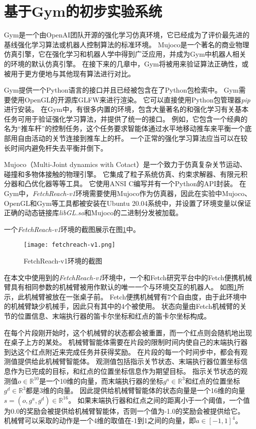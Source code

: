 \section{基于Gym的初步实验系统}\label{gymexp}
Gym\cite{brockman2016openai}是一个由OpenAI团队开源的强化学习仿真环境，它已经成为了评价最先进的基线强化学习算法或机器人控制算法的标准环境。
Mujoco\cite{todorov2012mujoco}是一个著名的商业物理仿真引擎，它在强化学习和机器人学中得到广泛应用，并成为Gym中机器人相关的环境的默认仿真引擎。
在接下来的几章中，Gym将被用来验证算法正确性，或被用于更方便地与其他现有算法进行对比。

Gym提供一个Python语言的接口并且已经被包含在了Python包检索中。
Gym需要使用OpenGL的开源库GLFW来进行渲染。
它可以直接使用Python包管理器\emph{pip}进行安装。
在Gym中，有很多内置的环境，包含大量著名的和强化学习有关基本任务可用于验证强化学习算法，并提供了统一的接口。
例如，它包含一个经典的名为“推车杆”的控制任务，这个任务要求智能体通过水平地移动推车来平衡一个底部用自由活动的关节连接到推车上的杆。
一个正常的强化学习算法应当可以在较长时间内避免杆失去平衡并倒下。

Mujoco（Multi-Joint dynamics with Cotact）是一个致力于仿真复杂关节运动、碰撞和多物体接触的物理引擎。
它集成了粒子系统仿真、约束求解器、有限元积分器和凸优化器等等工具。
它使用ANSI C编写并有一个Python的API封装。
在Gym中，\emph{FetchReach-v1}环境需要使用Mujoco作为仿真器，因此在实验中Mujoco、OpenGL和Gym等工具都被安装在Ubuntu 20.04系统中，并设置了环境变量以保证正确的动态链接库\emph{libGL.so}和Mujoco的二进制分发被加载。

一个\emph{FetchReach-v1}环境的截图展示在图\ref{fetchreach-v1}中。
    \begin{figure}[htpb]
        \centering
        \texttt{[image: fetchreach-v1.png]}
        \caption{FetchReach-v1环境的截图}
        \label{fetchreach-v1}
    \end{figure}
在本文中使用到的\emph{FetchReach-v1}环境中，一个和Fetch研究平台中的Fetch便携机械臂具有相同参数的机械臂被用作默认的唯一一个与环境交互的机器人\cite{Wise2016FetchF}。
如图\ref{fetchreach-v1}所示，此机械臂被放在一张桌子前。
Fetch便携机械臂有7个自由度，由于此环境中的机械臂缺少机械手，因此只有其中的4个被使用。
状态向量由Fetch机械臂的关节的位置信息、末端执行器的笛卡尔坐标和红点的笛卡尔坐标构成。


在每个片段刚开始时，这个机械臂的状态都会被重置，而一个红点则会随机地出现在桌子上方的某处。
机械臂智能体需要在片段的限制时间内使自己的末端执行器到达这个红点附近来完成任务并获得奖励。
在片段的每一个时间步中，都会有观测值提供给此机械臂智能体。
观测值包括指示关节状态、末端执行器位置坐标信息作为已完成的目标，和红点的位置坐标信息作为期望目标。
指示关节状态的观测值$o\in \mathbb R^{10}$是一个10维的向量，而末端执行器的坐标$g^a \in \mathbb R^3$和红点的位置坐标$g^d\in\mathbb R^3$都是3维的向量。
因此提供给机械臂智能体的状态向量是一个16维的向量$s=(o, g^a, g^d)\in \mathbb R^{16}$。
如果末端执行器和红点之间的距离小于一个阈值，一个值为0.0的奖励会被提供给机械臂智能体，否则一个值为-1.0的奖励会被提供给它。
机械臂可以采取的动作是一个4维的取值在-1到1之间的向量，即$a\in[-1,1]^4$。

